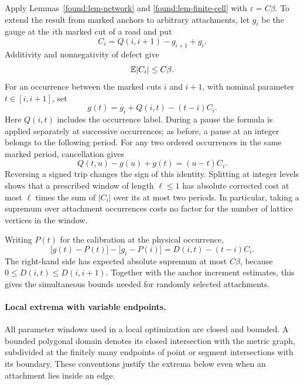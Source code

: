 Apply Lemmas~\ref{found:lem-network} and
\ref{found:lem-finite-cell} with $\varepsilon=C\beta$.  To extend the
result from marked anchors to arbitrary attachments, let $g_i$ be the
gauge at the $i$th marked cut of a road and put
\[
 C_i=Q(i,i+1)-g_{i+1}+g_i.
\]
Additivity and nonnegativity of defect give
\begin{equation}
 \mathbb E |C_i|\leq C\beta.                 \label{found:eq-slope}
\end{equation}
For an occurrence between the marked cuts $i$ and $i+1$, with nominal
parameter $t\in[i,i+1]$, set
\begin{equation}
 g(t)=g_i+Q(i,t)-(t-i)C_i.                  \label{found:eq-interpolation}
\end{equation}
Here $Q(i,t)$ includes the occurrence label.  During a pause the formula
is applied separately at successive occurrences; as before, a pause
at an integer belongs to the following period.  For any two ordered
occurrences in the same marked period, cancellation gives
\begin{equation}
 Q(t,u)-g(u)+g(t)=(u-t)C_i.                 \label{found:eq-short}
\end{equation}
Reversing a signed trip changes the sign of this identity.  Splitting
at integer levels shows that a prescribed window of length $\ell\le1$
has absolute corrected cost at most $\ell$ times the sum of $|C_i|$
over its at most two periods.  In particular, taking a supremum over
attachment occurrences costs no factor for the number of lattice
vertices in the window.

Writing $P(t)$ for the calibration at the physical occurrence,
\begin{equation}
 \bigl[g(t)-P(t)\bigr]-\bigl[g_i-P(i)\bigr]
       =D(i,t)-(t-i)C_i.                  \label{found:eq-interpolation-error}
\end{equation}
The right-hand side has expected absolute supremum at most $C\beta$,
because $0\le D(i,t)\le D(i,i+1)$.  Together with the anchor
increment estimates, this gives the simultaneous bounds needed for
randomly selected attachments.

\paragraph{Local extrema with variable endpoints.}
All parameter windows used in a local optimization are closed and
bounded. A bounded polygonal domain denotes its closed intersection
with the metric graph, subdivided at the finitely many endpoints of
point or segment intersections with its boundary. These conventions
justify the extrema below even when
an attachment lies inside an edge.

